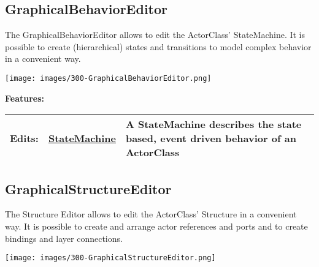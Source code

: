 \subsection{GraphicalBehaviorEditor}
	\hypertarget{ref:GraphicalBehaviorEditor}{}
	The GraphicalBehaviorEditor allows to edit the ActorClass' StateMachine. It is possible to create (hierarchical) states and transitions to model complex behavior in a convenient way.
		
	\begin{center}
		\texttt{[image: images/300-GraphicalBehaviorEditor.png]}
	\end{center}
		
		
	\begingroup
	\textbf{Features:}
	\renewcommand{\arraystretch}{1.8} %
	\begin{longtable}{l|l p{}}
		\hline
	Edits: & \tabitem \hyperlink{ref:StateMachine}{StateMachine}  & A StateMachine describes the state based, event driven behavior of an ActorClass\\
	\hline
	\end{longtable}
	\endgroup
		
		
	
	\vspace{\baselineskip}
	\vspace{\baselineskip}
	\vspace{\baselineskip}
	
\subsection{GraphicalStructureEditor}
	\hypertarget{ref:GraphicalStructureEditor}{}
	The Structure Editor allows to edit the ActorClass' Structure in a convenient way. It is possible to create and arrange actor references and ports and to create bindings and layer connections.
		
	\begin{center}
		\texttt{[image: images/300-GraphicalStructureEditor.png]}
	\end{center}
		
